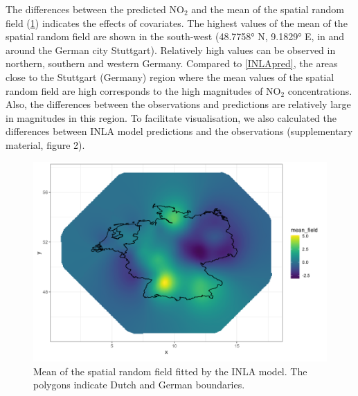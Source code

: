 \documentclass{article}
\begin{document}
The differences between the predicted NO$_2$ and the mean of the spatial random field (\cref{randomfield}) indicates the effects of covariates. The highest values of the mean of the spatial random field are shown in the south-west (48.7758° N, 9.1829° E, in and around the German city Stuttgart). Relatively high values can be observed in northern, southern and western Germany. Compared to \cref{INLApred}, the areas close to the Stuttgart (Germany) region where the mean values of the spatial random field are high corresponds to the high magnitudes of NO$_2$ concentrations. Also, the differences between the observations and predictions are relatively large in magnitudes in this region. To facilitate visualisation, we also calculated the differences between INLA model predictions and the observations  (supplementary material, figure 2).  

 
  

\begin{figure}
\centering
\includegraphics[scale = 0.5]{fig/mean_randomfield.png}
\caption{Mean of the spatial random field fitted by the INLA model. The polygons indicate Dutch and German boundaries.}
\label{randomfield}
\end{figure}
\end{document}
